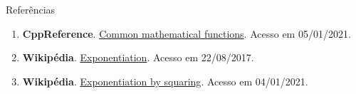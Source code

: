 \begin{frame}[fragile]{Referências}

    \begin{enumerate}
        \item \textbf{CppReference}. \href{https://en.cppreference.com/w/cpp/numeric/math}{Common mathematical functions}. Acesso em 05/01/2021.

       \item \textbf{Wikipédia}. \href{https://en.wikipedia.org/wiki/Exponentiation}{Exponentiation}. Acesso em 22/08/2017.

        \item \textbf{Wikipédia}. \href{https://en.wikipedia.org/wiki/Exponentiation_by_squaring}{Exponentiation by squaring}. Acesso em 04/01/2021.
    \end{enumerate}

\end{frame}

